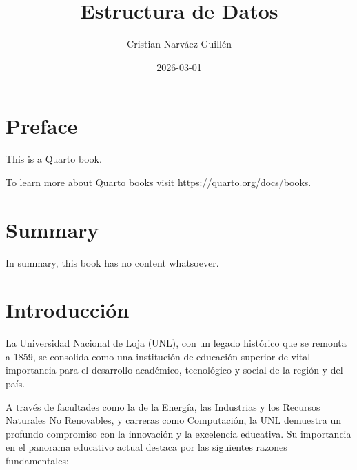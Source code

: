 \documentclass[
  spanish,
  letterpaper,
  DIV=11,
  numbers=noendperiod]{scrreprt}
\title{Estructura de Datos}
\author{Cristian Narváez Guillén}
\date{2026-03-01}
\renewcommand*\contentsname{Tabla de contenidos}
\newcommand\contentsname{Tabla de contenidos}
\begin{document}
\maketitle

\renewcommand*\contentsname{Tabla de contenidos}
{
\setcounter{tocdepth}{2}
\tableofcontents
}


\chapter*{Preface}\label{preface}


This is a Quarto book.

To learn more about Quarto books visit
\url{https://quarto.org/docs/books}.


\chapter{Summary}\label{summary}

In summary, this book has no content whatsoever.


\chapter{Introducción}\label{introducciuxf3n}

La Universidad Nacional de Loja (UNL), con un legado histórico que se
remonta a 1859, se consolida como una institución de educación superior
de vital importancia para el desarrollo académico, tecnológico y social
de la región y del país.

A través de facultades como la de la Energía, las Industrias y los
Recursos Naturales No Renovables, y carreras como Computación, la UNL
demuestra un profundo compromiso con la innovación y la excelencia
educativa. Su importancia en el panorama educativo actual destaca por
las siguientes razones fundamentales:
\end{document}
